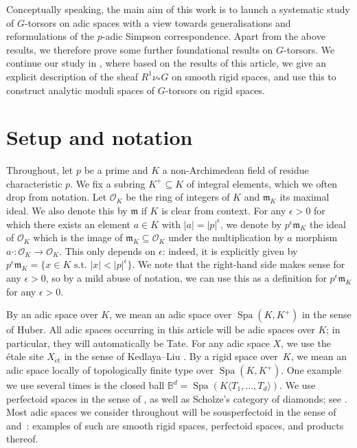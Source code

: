 \documentclass[11pt]{amsart}
\numberwithin{equation}{section}
\theoremstyle{definition}
\theoremstyle{remark}
\newcommand{\B}{\mathbb{B}}
\renewcommand{\O}{\mathcal{O}}
\newcommand{\Spa}{\operatorname{Spa}}
\newcommand{\et}{{\operatorname{\acute{e}t}}}
\begin{document}
\medskip

Conceptually speaking, the main aim of this work is to launch a systematic study of \mbox{$G$-torsors} on adic spaces with a view towards generalisations and reformulations of the \mbox{$p$-adic} Simpson correspondence. Apart from the above results, we therefore prove some further foundational results  on $G$-torsors. We continue our study in \cite{heuer-sheafified-paCS}, where based on the results of this article, we give an explicit description of the sheaf $R^1\nu_{\ast}G$ on smooth rigid spaces, and use this to construct analytic moduli spaces of $G$-torsors on rigid spaces.


\section*{Setup and notation}
Throughout, let $p$ be a prime and $K$ a non-Archimedean field of residue characteristic $p$. We fix a subring $K^+\subseteq K$ of integral elements, which we often drop from notation. Let $\O_K$ be the ring of integers of $K$ and $\mathfrak m_K$ its maximal ideal. We also denote this by $\mathfrak m$ if $K$ is clear from context. For any $\epsilon>0$ for which there exists an element $a\in K$ with $|a|=|p|^\epsilon$, we denote by $p^\epsilon \mathfrak m_K$ the ideal of $\O_K$ which is the image of $\mathfrak m_K\subseteq \O_K$ under the multiplication by $a$ morphism $a\cdot \colon \O_K\to \O_K$.  This only depends on $\epsilon$: indeed, it is explicitly given by
$p^\epsilon\mathfrak m_K=\{x\in K \text{ s.t.\ }|x|<|p|^{\epsilon}\}$. We note that the right-hand side makes sense for any $\epsilon>0$, so by a mild abuse of notation, we can use this as a definition for $p^\epsilon\mathfrak m_K$ for any $\epsilon>0$.

 By an adic space over $K$, we mean an adic space over $\Spa(K,K^+)$ in the sense of Huber. All adic spaces occurring in this article will be adic spaces over $K$; in particular, they will automatically be Tate.
  For any adic space $X$, we use the \'etale site $X_{\et}$ in the sense of Kedlaya--Liu \cite[Definition 8.2.16]{KedlayaLiu-rel-p-p-adic-Hodge-I}.
By a rigid space over~$K$, we mean an adic space locally of topologically finite type over $\Spa(K,K^+)$. One example we use several times is the closed ball $\B^d=\Spa(K\langle T_1,\dots,T_d\rangle)$. We use perfectoid spaces in the sense of \cite{perfectoid-spaces}, as well as Scholze's category of diamonds; see  \cite{etale-cohomology-of-diamonds}.
Most adic spaces we consider throughout will be sousperfectoid in the sense of \cite[Section~6.3]{ScholzeBerkeleyLectureNotes} and~\cite{HK_sheafiness}: examples of such are smooth rigid spaces, perfectoid spaces, and products thereof. 
\end{document}
